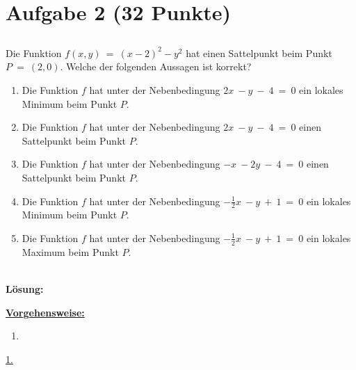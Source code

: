 \section*{Aufgabe 2 (32 Punkte)}
\vspace{0.4cm}
\subsection*{}
Die Funktion $ f(x,y) \ = \ (x-2)^2 -y^2 $ hat einen Sattelpunkt beim Punkt $ P \ = \ (2,0) $. Welche der folgenden Aussagen ist korrekt?
\renewcommand{\labelenumi}{(\alph{enumi})}
\begin{enumerate}
	\item Die Funktion $ f $ hat unter der Nebenbedingung $ 2x \ - y \ - \ 4 \ = \ 0 $ ein lokales Minimum beim Punkt $ P $.
	\item Die Funktion $ f $ hat unter der Nebenbedingung $ 2x \ - y \ - \ 4 \ = \ 0 $ einen Sattelpunkt beim Punkt $ P $.
	\item Die Funktion $ f $ hat unter der Nebenbedingung $ -x \ - 2y \ - \ 4 \ = \ 0 $ einen Sattelpunkt beim Punkt $ P $.
	\item Die Funktion $ f $ hat unter der Nebenbedingung $ -\frac{1}{2}x \ - y \ + \ 1 \ = \ 0 $ ein lokales Minimum beim Punkt $ P $.
	\item Die Funktion $ f $ hat unter der Nebenbedingung $ -\frac{1}{2}x \ - y \ + \ 1 \ = \ 0 $ ein lokales Maximum beim Punkt $ P $.
\end{enumerate}
\ \\
\textbf{Lösung:}
\begin{mdframed}
\underline{\textbf{Vorgehensweise:}}
\renewcommand{\labelenumi}{\theenumi.}
\begin{enumerate}
\item 
\end{enumerate}
\end{mdframed}

\underline{1. }\\


\newpage

